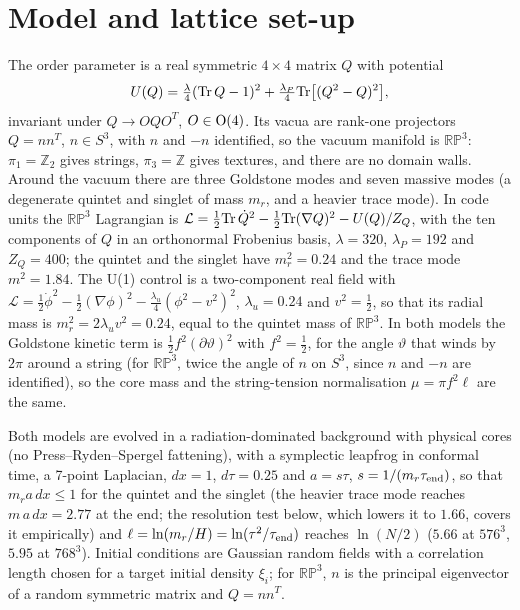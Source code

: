 \documentclass[prd,twocolumn,superscriptaddress,nofootinbib,amsmath,amssymb]{revtex4-2}
\newcommand{\RP}{\mathbb{RP}^3}
\newcommand{\Ztwo}{\mathbb{Z}_2}
\begin{document}
\section{Model and lattice set-up}
\label{sec:setup}

The order parameter is a real symmetric $4\times4$ matrix $Q$ with potential
\begin{equation}
U(Q) = \tfrac{\lambda}{4}({\rm Tr}\,Q-1)^2 + \tfrac{\lambda_P}{4}{\rm Tr}\big[(Q^2-Q)^2\big],
\end{equation}
invariant under $Q\to OQO^T$, $O\in{\rm O}(4)$.
Its vacua are rank-one projectors $Q=nn^T$, $n\in S^3$, with $n$ and $-n$ identified, so the vacuum manifold is $\RP$: $\pi_1=\Ztwo$ gives strings, $\pi_3=\mathbb{Z}$ gives textures, and there are no domain walls.
Around the vacuum there are three Goldstone modes and seven massive modes (a degenerate quintet and singlet of mass $m_r$, and a heavier trace mode).
In code units the $\RP$ Lagrangian is $\mathcal{L}=\tfrac12{\rm Tr}\,\dot Q^2-\tfrac12{\rm Tr}(\nabla Q)^2-U(Q)/Z_Q$, with the ten components of $Q$ in an orthonormal Frobenius basis, $\lambda=320$, $\lambda_P=192$ and $Z_Q=400$; the quintet and the singlet have $m_r^2=0.24$ and the trace mode $m^2=1.84$.
The U(1) control is a two-component real field with $\mathcal{L}=\tfrac12\dot\phi^2-\tfrac12(\nabla\phi)^2-\tfrac{\lambda_u}{4}(\phi^2-v^2)^2$, $\lambda_u=0.24$ and $v^2=\tfrac12$, so that its radial mass is $m_r^2=2\lambda_uv^2=0.24$, equal to the quintet mass of $\RP$.
In both models the Goldstone kinetic term is $\tfrac12f^2(\partial\vartheta)^2$ with $f^2=\tfrac12$, for the angle $\vartheta$ that winds by $2\pi$ around a string (for $\RP$, twice the angle of $n$ on $S^3$, since $n$ and $-n$ are identified), so the core mass and the string-tension normalisation $\mu=\pi f^2\ell$ are the same.

Both models are evolved in a radiation-dominated background with physical cores (no Press--Ryden--Spergel fattening), with a symplectic leapfrog in conformal time, a 7-point Laplacian, $dx=1$, $d\tau=0.25$ and $a=s\tau$, $s=1/(m_r\tau_{\rm end})$, so that $m_r a\,dx\le1$ for the quintet and the singlet (the heavier trace mode reaches $m\,a\,dx=2.77$ at the end; the resolution test below, which lowers it to $1.66$, covers it empirically) and $\ell=\ln(m_r/H)=\ln(\tau^2/\tau_{\rm end})$ reaches $\ln(N/2)$ ($5.66$ at $576^3$, $5.95$ at $768^3$).
Initial conditions are Gaussian random fields with a correlation length chosen for a target initial density $\xi_i$; for $\RP$, $n$ is the principal eigenvector of a random symmetric matrix and $Q=nn^T$.
\end{document}
